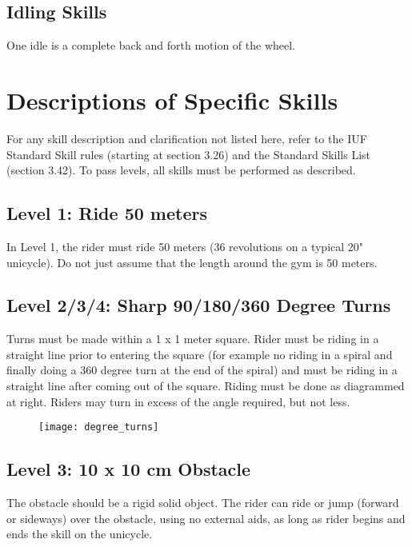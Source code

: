 \subsection{Idling Skills}
One idle is a complete back and forth motion of the wheel.

\section{Descriptions of Specific Skills}
For any skill description and clarification not listed here, refer to the IUF Standard Skill rules (starting at section 3.26) and
the Standard Skills List (section 3.42). To pass levels, all skills must be performed as described.

\subsection{Level 1: Ride 50 meters}
In Level 1, the rider must ride 50 meters (36 revolutions on a typical 20" unicycle). Do not just assume that the length
around the gym is 50 meters.

\subsection{Level 2/3/4: Sharp 90/180/360 Degree Turns}
Turns must be made within a 1 x 1 meter square. Rider must be riding in a straight line prior to entering the square (for
example no riding in a spiral and finally doing a 360 degree turn at the end of the spiral) and must be riding in a straight line after coming out of the square. Riding must be done as diagrammed at right. Riders may turn in excess of the angle required, but not less.

\begin{figure}[h]
\begin{center}
\texttt{[image: degree\_turns]}
\end{center}
\vspace{-20pt}
\vspace{-10pt}
\end{figure}
 
\subsection{Level 3: 10 x 10 cm Obstacle}
The obstacle should be a rigid solid object. The rider can ride or jump (forward or sideways) over the obstacle, using
no external aids, as long as rider begins and ends the skill on the unicycle.

